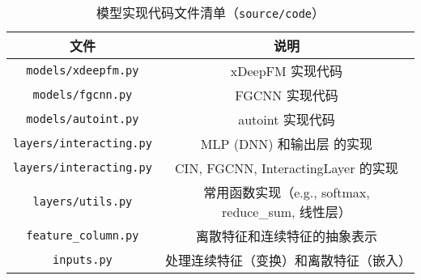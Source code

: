\documentclass[degree=master,cjk-font=noto]{thuthesis}
\begin{document}
\begin{table}[htb]
  \centering
  \caption{模型实现代码文件清单（\texttt{source/code}）}
  \label{tab:files}
  \begin{tabular}{cc}
    \toprule
    \textbf{文件}         & \textbf{说明}  \\
    \midrule
    \texttt{models/xdeepfm.py} & xDeepFM 实现代码 \\
    \texttt{models/fgcnn.py} & FGCNN 实现代码 \\
    \texttt{models/autoint.py} & autoint 实现代码 \\
    \texttt{layers/interacting.py}           & MLP (DNN) 和输出层 的实现 \\
    \texttt{layers/interacting.py}           & CIN, FGCNN, InteractingLayer 的实现 \\
    \texttt{layers/utils.py}        & 常用函数实现（e.g., softmax, reduce\_sum, 线性层） \\
    \texttt{feature\_column.py} & 离散特征和连续特征的抽象表示 \\
    \texttt{inputs.py} & 处理连续特征（变换）和离散特征（嵌入）\\
    \bottomrule
  \end{tabular}
\end{table}
\end{document}
